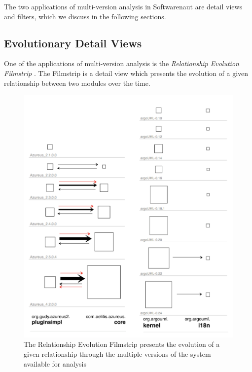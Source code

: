 \documentclass[preprint,12pt]{elsarticle}
\begin{document}
The two applications of multi-version analysis in Softwarenaut are detail views and filters, which we discuss in the following sections.

\subsection {Evolutionary Detail Views}

One of the applications of multi-version analysis is the {\em Relationship Evolution Filmstrip} \cite{lungu-relevo}. The Filmstrip is a detail view which presents the evolution of a given relationship between two modules over the time. %

\begin{figure}[ht!]
\begin{center}
\includegraphics[width=\linewidth]{images/Filmstrip}
\caption{The Relationship Evolution Filmstrip presents the evolution of a given relationship through the multiple versions of the system available for analysis}
\end{center}
\end{figure}
\end{document}
